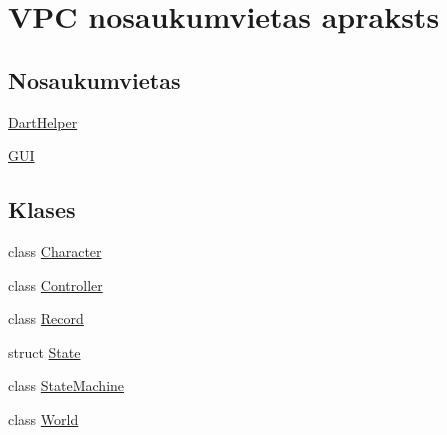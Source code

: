 \hypertarget{namespace_v_p_c}{}\section{V\+PC nosaukumvietas apraksts}
\label{namespace_v_p_c}
\subsection*{Nosaukumvietas}
\begin{DoxyCompactItemize}
\item 
 \hyperlink{namespace_v_p_c_1_1_dart_helper}{Dart\+Helper}
\item 
 \hyperlink{namespace_v_p_c_1_1_g_u_i}{G\+UI}
\end{DoxyCompactItemize}
\subsection*{Klases}
\begin{DoxyCompactItemize}
\item 
class \hyperlink{class_v_p_c_1_1_character}{Character}
\item 
class \hyperlink{class_v_p_c_1_1_controller}{Controller}
\item 
class \hyperlink{class_v_p_c_1_1_record}{Record}
\item 
struct \hyperlink{struct_v_p_c_1_1_state}{State}
\item 
class \hyperlink{class_v_p_c_1_1_state_machine}{State\+Machine}
\item 
class \hyperlink{class_v_p_c_1_1_world}{World}
\end{DoxyCompactItemize}
